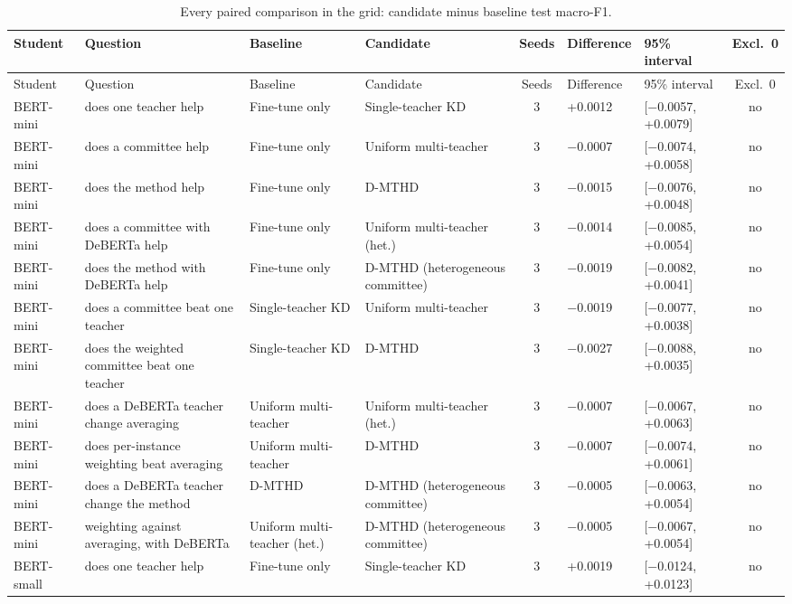 {\scriptsize
\setlength{\tabcolsep}{3pt}
\begin{longtable}{p{1.5cm}p{2.9cm}p{2.5cm}p{2.6cm}cp{1.0cm}p{1.8cm}c}
\caption{Every paired comparison in the grid: candidate minus baseline test macro-F1.}
\label{tab:significance}\\
\toprule
Student & Question & Baseline & Candidate & Seeds & Difference & 95\% interval & Excl.\ 0 \\
\midrule
\endfirsthead
\toprule
Student & Question & Baseline & Candidate & Seeds & Difference & 95\% interval & Excl.\ 0 \\
\midrule
\endhead
\bottomrule
\endfoot
BERT-mini & does one teacher help & Fine-tune only & Single-teacher KD & 3 & +0.0012 & [$-$0.0057, +0.0079] & no \\
BERT-mini & does a committee help & Fine-tune only & Uniform multi-teacher & 3 & $-$0.0007 & [$-$0.0074, +0.0058] & no \\
BERT-mini & does the method help & Fine-tune only & D-MTHD & 3 & $-$0.0015 & [$-$0.0076, +0.0048] & no \\
BERT-mini & does a committee with DeBERTa help & Fine-tune only & Uniform multi-teacher (het.) & 3 & $-$0.0014 & [$-$0.0085, +0.0054] & no \\
BERT-mini & does the method with DeBERTa help & Fine-tune only & D-MTHD (heterogeneous committee) & 3 & $-$0.0019 & [$-$0.0082, +0.0041] & no \\
BERT-mini & does a committee beat one teacher & Single-teacher KD & Uniform multi-teacher & 3 & $-$0.0019 & [$-$0.0077, +0.0038] & no \\
BERT-mini & does the weighted committee beat one teacher & Single-teacher KD & D-MTHD & 3 & $-$0.0027 & [$-$0.0088, +0.0035] & no \\
BERT-mini & does a DeBERTa teacher change averaging & Uniform multi-teacher & Uniform multi-teacher (het.) & 3 & $-$0.0007 & [$-$0.0067, +0.0063] & no \\
BERT-mini & does per-instance weighting beat averaging & Uniform multi-teacher & D-MTHD & 3 & $-$0.0007 & [$-$0.0074, +0.0061] & no \\
BERT-mini & does a DeBERTa teacher change the method & D-MTHD & D-MTHD (heterogeneous committee) & 3 & $-$0.0005 & [$-$0.0063, +0.0054] & no \\
BERT-mini & weighting against averaging, with DeBERTa & Uniform multi-teacher (het.) & D-MTHD (heterogeneous committee) & 3 & $-$0.0005 & [$-$0.0067, +0.0054] & no \\
BERT-small & does one teacher help & Fine-tune only & Single-teacher KD & 3 & +0.0019 & [$-$0.0124, +0.0123] & no \\

\end{longtable}}
